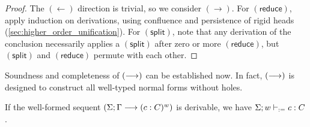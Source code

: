 \documentclass[twoside]{report}
\begin{document}
\begin{proof}
The $(\leftarrow)$ direction is trivial, so we consider $(\rightarrow)$. For $(\mathsf{reduce})$, apply induction on derivations, using confluence and persistence of rigid heads (\cref{sec:higher_order_unification}). For $(\mathsf{split})$, note that any derivation of the conclusion necessarily applies a $(\mathsf{split})$ after zero or more $(\mathsf{reduce})$, but $(\mathsf{split})$ and $(\mathsf{reduce})$ permute with each other.
\end{proof}

Soundness and completeness of $(\longrightarrow)$ can be established now. In fact, $(\longrightarrow)$ is designed to construct all well-typed normal forms without holes.

\begin{proposition}
\label{thm:focused_calculus_soundness}
If the well-formed sequent $(\Sigma; \Gamma \longrightarrow (c : C)^w)$ is derivable, we have $\Sigma; w \vdash_{:=} c : C$.
\end{proposition}
\end{document}
